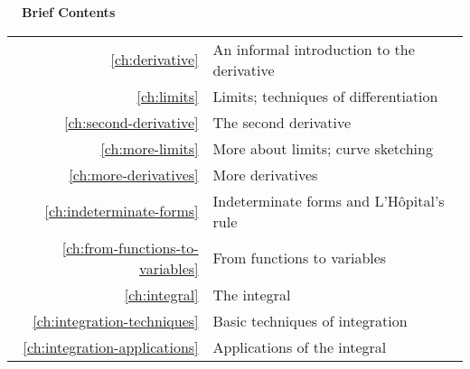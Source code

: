\documentclass{fund}
\begin{document}
%

\cleardoublepage





\pagebreak\vspace{100mm}

\hbox{}\noindent\huge\bfseries\sffamily{}\hspace{-2mm}\ \ Brief Contents\\
\hspace{-20mm}\noindent\mynormaltype\Large\sffamily{}\begin{tabular}{rl}
\ref{ch:derivative} & An informal introduction to the derivative \quad \pageref{ch:derivative}\\
\ref{ch:limits} &  Limits; techniques of differentiation \quad \pageref{ch:limits}\\
\ref{ch:second-derivative} & The second derivative \quad \pageref{ch:second-derivative}\\
\ref{ch:more-limits} & More about limits; curve sketching\quad \pageref{ch:more-limits}\\
\ref{ch:more-derivatives} & More derivatives\quad \pageref{ch:more-derivatives}\\
\ref{ch:indeterminate-forms} & Indeterminate forms and L'H\^{o}pital's rule 
                  \quad \pageref{ch:indeterminate-forms} \\
\ref{ch:from-functions-to-variables} & From functions to variables
                  \quad \pageref{ch:from-functions-to-variables} \\
\ref{ch:integral} & The integral
                  \quad \pageref{ch:integral} \\
\ref{ch:integration-techniques} & 
                  Basic techniques of integration
                  \quad \pageref{ch:integration-techniques} \\
\ref{ch:integration-applications} & 
                  Applications of the integral
                  \quad \pageref{ch:integration-applications} \\
\end{tabular}
\mynormaltype

\vspace{100mm}\pagebreak

\cleardoublepage

\mynormaltype
\end{document}
